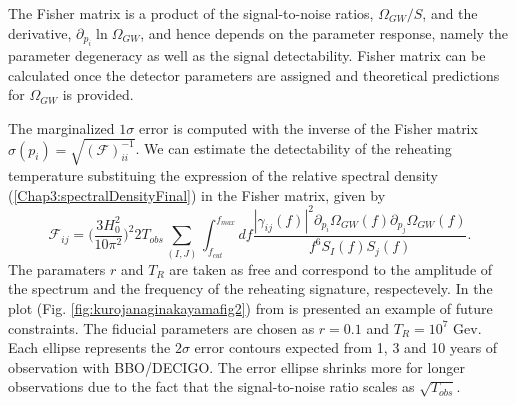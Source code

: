 \documentclass[11pt,a4paper,twoside]{book}
\begin{document}
The Fisher matrix is a product of the signal-to-noise ratios, $ \Omega_{GW}/S $, and the derivative, $ \partial_{p_{i}} \ln \Omega_{GW} $, and hence depends on the parameter response, namely the parameter degeneracy as well as the signal detectability. Fisher matrix can be calculated once the detector parameters are assigned and theoretical predictions for $\Omega_{GW}$ is provided.

The marginalized $ 1\sigma $ error is computed with the inverse of the Fisher matrix 
$ \sigma(p_{i}) = \sqrt{(\mathcal{F})^{-1}_{ii}} $. 
We can estimate the detectability of the reheating temperature substituing the expression of the relative spectral density (\ref{Chap3:spectralDensityFinal}) in the Fisher matrix, given by
\begin{equation}
	\label{FisherMatrix}
	\mathcal{F}_{ij}= \Bigg (\frac{3H_{0}^{2}}{10\pi^{2}}\Bigg)^{2}2T_{obs}\sum_{(I,J)}\int_{f_{cut}}^{f_{max}}
	df\frac{|\gamma_{ij}(f)|^{2} \partial_{p_{i}} \Omega_{GW}(f)\partial_{p_{j}}\Omega_{GW}(f)}{f^{6}S_{I}(f)S_{j}(f)}.
\end{equation}
The paramaters  $ r $ and $ T_{R} $ are taken as free and correspond to the amplitude of the spectrum and the frequency of the reheating signature, respectevely. In the plot (Fig. \ref{fig:kurojanaginakayamafig2}) from \cite{Chap3:ProspectsForDeterminationWithDetectors} is presented an example of future constraints. The fiducial parameters are chosen as $ r = 0.1 $ and $ T_{R}=10^{7} $ Gev. Each ellipse represents the $ 2\sigma $ error contours expected from 1, 3 and 10 years of observation with 	BBO/DECIGO. The error ellipse shrinks more for longer observations due to the fact that the signal-to-noise ratio scales as $\sqrt{T_{obs}}$. 
\end{document}
